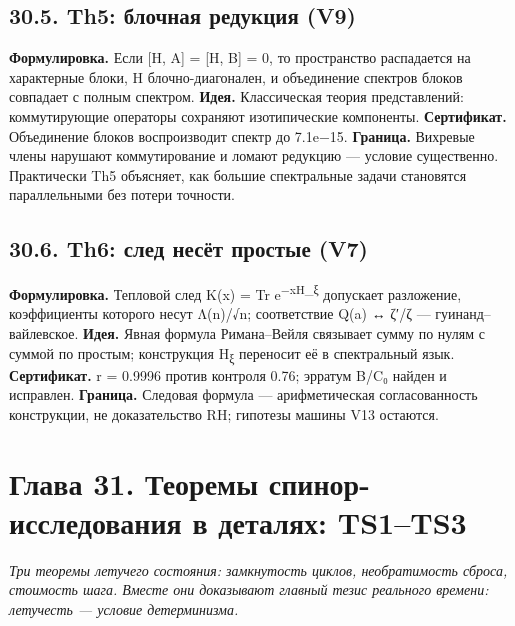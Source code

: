 \documentclass[11pt,a4paper]{article}
\begin{document}
\subsection{30.5. Th5: блочная редукция (V9)}

\textbf{Формулировка.} Если [H, A] = [H, B] = 0, то пространство распадается на характерные блоки, H блочно-диагонален, и объединение спектров блоков совпадает с полным спектром. \textbf{Идея.} Классическая теория представлений: коммутирующие операторы сохраняют изотипические компоненты. \textbf{Сертификат.} Объединение блоков воспроизводит спектр до 7.1e−15. \textbf{Граница.} Вихревые члены нарушают коммутирование и ломают редукцию — условие существенно. Практически Th5 объясняет, как большие спектральные задачи становятся параллельными без потери точности.

\subsection{30.6. Th6: след несёт простые (V7)}

\textbf{Формулировка.} Тепловой след K(x) = Tr e\textsuperscript{−xH\_ξ} допускает разложение, коэффициенты которого несут Λ(n)/√n; соответствие Q(a) ↔ ζ′/ζ — гуинанд–вайлевское. \textbf{Идея.} Явная формула Римана–Вейля связывает сумму по нулям с суммой по простым; конструкция H\textsubscript{ξ} переносит её в спектральный язык. \textbf{Сертификат.} r = 0.9996 против контроля 0.76; эрратум B/C₀ найден и исправлен. \textbf{Граница.} Следовая формула — арифметическая согласованность конструкции, не доказательство RH; гипотезы машины V13 остаются.

\begin{center}\end{center}

\section{Глава 31. Теоремы спинор-исследования в деталях: TS1–TS3}

\noindent\textit{\color{copper}Три теоремы летучего состояния: замкнутость циклов, необратимость сброса, стоимость шага. Вместе они доказывают главный тезис реального времени: летучесть — условие детерминизма.}
\end{document}
